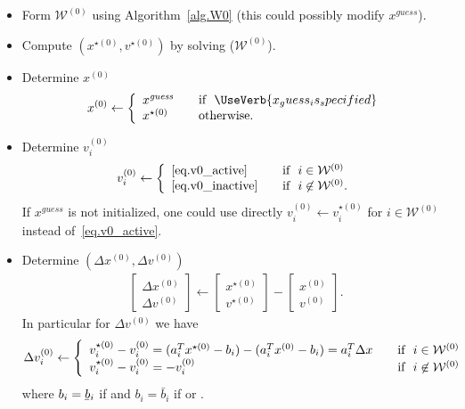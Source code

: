\documentclass[12pt,a4paper]{article}
\newcommand{\ubar}[1]{\underaccent{\bar}{#1}}
\begin{document}
\begin{itemize}
\item Form $\mathcal{W}^{(0)}$ using Algorithm~\ref{alg.W0} (this could possibly modify $x^{\mathit{guess}}$).
\item Compute $(x^{\star(0)},v^{\star(0)})$ by solving ($\mathcal{W}^{(0)}$).
\item Determine $x^{(0)}$
    \begin{align*}
      x^{(0)} \leftarrow \left\{ 
      \begin{array}{l l}
        x^{\mathit{guess}} & \quad \text{if} \,\,\,\, \UseVerb{x_guess_is_specified} \\
        x^{\star(0)} & \quad \text{otherwise}.
      \end{array} \right.
    \end{align*}

\item Determine $v_i^{(0)}$
%
    \begin{align*}
      v_i^{(0)} \leftarrow \left\{ 
      \begin{array}{l l}
        \eqref{eq.v0_active} & \quad \text{if} \,\,\,\, i\in\mathcal{W}^{(0)} \\
        \eqref{eq.v0_inactive} & \quad \text{if} \,\,\,\, i\not\in\mathcal{W}^{(0)}.
      \end{array} \right.
    \end{align*}
    If $x^{\mathit{guess}}$ is not initialized, one could use directly $v_i^{(0)} \leftarrow v_i^{\star(0)}$
    for $i\in\mathcal{W}^{(0)}$ instead of~\eqref{eq.v0_active}.

\item Determine $(\Delta x^{(0)}, \Delta v^{(0)})$
%
  \begin{align*}
    \begin{bmatrix} \Delta x^{(0)} \\ \Delta v^{(0)} \end{bmatrix} \leftarrow 
    \begin{bmatrix} x^{\star(0)} \\ v^{\star(0)} \end{bmatrix}  - 
    \begin{bmatrix} x^{(0)} \\ v^{(0)} \end{bmatrix}.
  \end{align*}
  In particular for $\Delta v^{(0)}$ we have
  \begin{align*}
    \Delta v_i^{(0)} \leftarrow \left\{ 
    \begin{array}{l l}
      v_i^{\star(0)} - v_i^{(0)} = (a_i^Tx^{\star(0)} - b_i) - (a_i^Tx^{(0)} - b_i) = a_i^T\Delta x & \quad \text{if} \,\,\,\, i\in\mathcal{W}^{(0)} \\
      v_i^{\star(0)} - v_i^{(0)} = -v_i^{(0)} & \quad \text{if} \,\,\,\, i\not\in\mathcal{W}^{(0)}
    \end{array} \right.
  \end{align*}
  where $b_i = \ubar{b}_i$ if  and $b_i = \bar{b}_i$ if  or .


\end{itemize}
\end{document}
